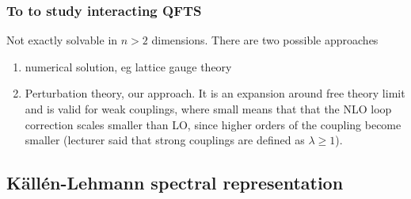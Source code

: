 \subsubsection{To to study interacting QFTS}
Not exactly solvable in $n>2$ dimensions. There are two possible approaches
\begin{enumerate}
	\item numerical solution, eg lattice gauge theory
	\item Perturbation theory, our approach. It is an expansion around free theory limit and is valid for weak couplings, where small means that that the NLO loop correction scales smaller than LO, since higher orders of the coupling become smaller (lecturer said that strong couplings are defined as $\lambda \geq 1$).
\end{enumerate}






\subsection{Källén-Lehmann spectral representation}
